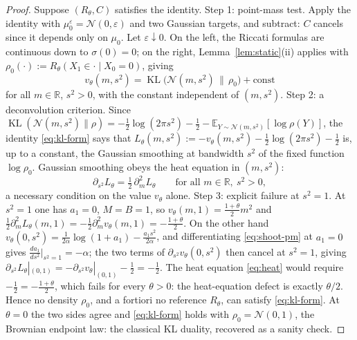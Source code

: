 \documentclass[10pt,a4paper]{amsart}
\newcommand{\EE}{\mathbb{E}}
\newcommand{\KL}{\operatorname{KL}}
\newcommand{\RR}{\mathbb{R}}
\newcommand{\cN}{\mathcal{N}}
\begin{document}
	\begin{proof}
		Suppose $(R_\theta,C)$ satisfies the identity. {Step 1: point-mass
			test.} Apply the identity with $\mu_0^\varepsilon=\cN(0,\varepsilon)$ and
		two Gaussian targets, and subtract: $C$ cancels since it depends only on
		$\mu_0$. Let $\varepsilon\downarrow0$. On the left, the Riccati formulas
		are continuous down to $\sigma(0)=0$; on the right,
		Lemma~\ref{lem:static}(ii) applies with
		$\rho_0(\cdot):=R_\theta(X_1\in\cdot\mid X_0=0)$, giving
		\begin{equation}
			\label{eq:kl-form}
			v_\theta(m,s^2)=\KL\bigl(\cN(m,s^2)\,\|\,\rho_0\bigr)+\mathrm{const}
		\end{equation}
		for all $m\in\RR$, $s^2>0$, with the constant independent of $(m,s^2)$. {Step 2: a deconvolution
			criterion.} Since
		$\KL(\cN(m,s^2)\|\rho)=-\tfrac12\log(2\pi s^2)-\tfrac12
		-\EE_{Y\sim\cN(m,s^2)}[\log\rho(Y)]$, the identity \eqref{eq:kl-form} says
		that
		$L_\theta(m,s^2):=-v_\theta(m,s^2)-\tfrac12\log(2\pi s^2)-\tfrac12$
		is, up to a constant, the Gaussian smoothing at bandwidth $s^2$ of the
		fixed function $\log\rho_0$. Gaussian smoothing obeys the heat
		equation in $(m,s^2)$:
		\begin{equation}
			\label{eq:heat}
			\partial_{s^2}L_\theta=\tfrac12\,\partial_m^2 L_\theta
			\qquad\text{for all }m\in\RR,\ s^2>0,
		\end{equation}
		a necessary condition on the value $v_\theta$ alone. {Step 3: explicit
			failure at $s^2=1$.} At $s^2=1$ one has $a_1=0$, $M=B=1$, so
		$v_\theta(m,1)=\frac{1+\theta}{2}m^2$ and $\tfrac12\partial_m^2
		L_\theta(m,1)=-\tfrac12\partial_m^2 v_\theta(m,1)=-\frac{1+\theta}{2}$.
		On the other hand $v_\theta(0,s^2)=\frac{1}{2\alpha}\log(1+a_1)-\frac{a_1
			s^2}{2\alpha}$, and differentiating \eqref{eq:shoot-pm} at $a_1=0$ gives
		$\frac{da_1}{ds^2}\big|_{s^2=1}=-\alpha$; the two terms of
		$\partial_{s^2}v_\theta(0,s^2)$ then cancel at $s^2=1$, giving
		$\partial_{s^2}L_\theta|_{(0,1)}=-\partial_{s^2}v_\theta|_{(0,1)}
		-\tfrac12=-\frac12$. The heat equation \eqref{eq:heat} would require
		$-\tfrac12=-\tfrac{1+\theta}{2}$, which fails for every $\theta>0$: the
		heat-equation defect is exactly $\theta/2$. Hence no density $\rho_0$, and
		{a fortiori} no reference $R_\theta$, can satisfy \eqref{eq:kl-form}.
		At $\theta=0$ the two sides agree and \eqref{eq:kl-form} holds with
		$\rho_0=\cN(0,1)$, the Brownian endpoint law: the classical KL duality, recovered as a sanity check.
	\end{proof}
\end{document}
